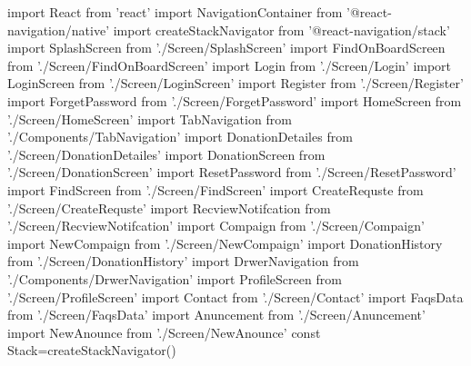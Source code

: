 import React from 'react'
import {NavigationContainer} from '@react-navigation/native'
import {createStackNavigator} from '@react-navigation/stack'
import SplashScreen from './Screen/SplashScreen' 
import FindOnBoardScreen from './Screen/FindOnBoardScreen'
import Login from './Screen/Login'
import LoginScreen from './Screen/LoginScreen'
import Register from './Screen/Register'
import ForgetPassword from './Screen/ForgetPassword'
import HomeScreen from './Screen/HomeScreen'
import TabNavigation from './Components/TabNavigation'
import DonationDetailes from './Screen/DonationDetailes'
import DonationScreen from './Screen/DonationScreen'
import ResetPassword from './Screen/ResetPassword'
import FindScreen from './Screen/FindScreen'
import CreateRequste from './Screen/CreateRequste'
import RecviewNotifcation from './Screen/RecviewNotifcation'
import Compaign from './Screen/Compaign'
import NewCompaign from './Screen/NewCompaign'
import DonationHistory from './Screen/DonationHistory'
import DrwerNavigation from './Components/DrwerNavigation'
import ProfileScreen from './Screen/ProfileScreen'
import Contact from './Screen/Contact'
import FaqsData from './Screen/FaqsData'
import Anuncement from './Screen/Anuncement'
import NewAnounce from './Screen/NewAnounce'
const Stack=createStackNavigator()

